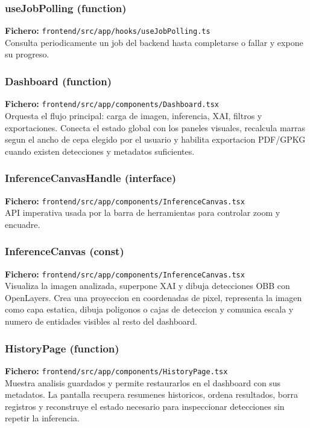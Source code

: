 \subsubsection*{useJobPolling (function)}
\noindent\textbf{Fichero:} \texttt{frontend/src/app/hooks/useJobPolling.ts}\\
Consulta periodicamente un job del backend hasta completarse o fallar y expone su progreso.


\subsubsection*{Dashboard (function)}
\noindent\textbf{Fichero:} \texttt{frontend/src/app/components/Dashboard.tsx}\\
Orquesta el flujo principal: carga de imagen, inferencia, XAI, filtros y exportaciones. Conecta el estado global con los paneles visuales, recalcula marras segun el ancho de cepa elegido por el usuario y habilita exportacion PDF/GPKG cuando existen detecciones y metadatos suficientes.


\subsubsection*{InferenceCanvasHandle (interface)}
\noindent\textbf{Fichero:} \texttt{frontend/src/app/components/InferenceCanvas.tsx}\\
API imperativa usada por la barra de herramientas para controlar zoom y encuadre.


\subsubsection*{InferenceCanvas (const)}
\noindent\textbf{Fichero:} \texttt{frontend/src/app/components/InferenceCanvas.tsx}\\
Visualiza la imagen analizada, superpone XAI y dibuja detecciones OBB con OpenLayers. Crea una proyeccion en coordenadas de pixel, representa la imagen como capa estatica, dibuja poligonos o cajas de deteccion y comunica escala y numero de entidades visibles al resto del dashboard.


\subsubsection*{HistoryPage (function)}
\noindent\textbf{Fichero:} \texttt{frontend/src/app/components/HistoryPage.tsx}\\
Muestra analisis guardados y permite restaurarlos en el dashboard con sus metadatos. La pantalla recupera resumenes historicos, ordena resultados, borra registros y reconstruye el estado necesario para inspeccionar detecciones sin repetir la inferencia.


